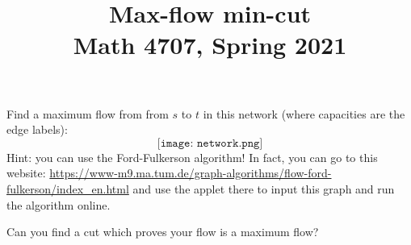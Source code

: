\documentclass[11pt]{article}
\title{Max-flow min-cut \\ Math 4707, Spring 2021}
\begin{document}
\maketitle

\thispagestyle{empty}


Find a maximum flow from from $s$ to $t$ in this network (where capacities are the edge labels):
\[ \texttt{[image: network.png]} \]
Hint: you can use the Ford-Fulkerson algorithm! In fact, you can go to this website: {\small \url{https://www-m9.ma.tum.de/graph-algorithms/flow-ford-fulkerson/index_en.html}} and use the applet there to input this graph and run the algorithm online.

Can you find a cut which proves your flow is a maximum flow?
\end{document}
